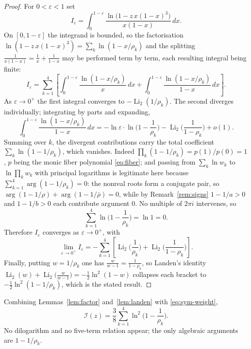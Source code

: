 \documentclass[11pt]{article}
\theoremstyle{definition}
\DeclareMathOperator{\Li}{Li}
\begin{document}
\begin{proof}
For $0<\varepsilon<1$ set
\[
  I_\varepsilon=\int_0^{1-\varepsilon}\frac{\ln\!\big(1-z\,x(1-x)^3\big)}{x(1-x)}\,dx .
\]
On $[0,1-\varepsilon]$ the integrand is bounded, so the factorisation
$\ln(1-z\,x(1-x)^3)=\sum_k\ln(1-x/\rho_k)$ and the splitting
$\tfrac1{x(1-x)}=\tfrac1x+\tfrac1{1-x}$ may be performed term by term, each resulting integral being
finite:
\[
  I_\varepsilon=\sum_{k=1}^4\left[\int_0^{1-\varepsilon}\frac{\ln(1-x/\rho_k)}{x}\,dx
  +\int_0^{1-\varepsilon}\frac{\ln(1-x/\rho_k)}{1-x}\,dx\right].
\]
As $\varepsilon\to0^+$ the first integral converges to $-\Li_2(1/\rho_k)$. The second diverges
individually; integrating by parts and expanding,
\[
  \int_0^{1-\varepsilon}\frac{\ln(1-x/\rho_k)}{1-x}\,dx
  =-\ln\varepsilon\cdot\ln\!\Big(1-\frac1{\rho_k}\Big)-\Li_2\!\Big(\frac{1}{1-\rho_k}\Big)+o(1).
\]
Summing over $k$, the divergent contributions carry the total coefficient
$\sum_{k}\ln(1-1/\rho_k)$, which vanishes. Indeed $\prod_k(1-1/\rho_k)=p(1)/p(0)=1$, $p$ being the
monic fiber polynomial \eqref{eq:fiber}; and passing from $\sum_k\ln w_k$ to $\ln\prod_k w_k$ with
principal logarithms is legitimate here because $\sum_{k=1}^4\arg(1-1/\rho_k)=0$: the nonreal roots
form a conjugate pair, so $\arg(1-1/\rho)+\arg(1-1/\bar\rho)=0$, while by Remark~\ref{rem:signs}
$1-1/a>0$ and $1-1/b>0$ each contribute argument $0$. No multiple of $2\pi i$ intervenes, so
\[
  \sum_{k=1}^4\ln\Big(1-\frac1{\rho_k}\Big)=\ln 1=0 .
\]
Therefore $I_\varepsilon$ converges as $\varepsilon\to0^+$, with
\[
  \lim_{\varepsilon\to0^+}I_\varepsilon
  =-\sum_{k=1}^4\left[\Li_2\!\Big(\frac1{\rho_k}\Big)+\Li_2\!\Big(\frac{1}{1-\rho_k}\Big)\right].
\]
Finally, putting $w=1/\rho_k$ one has $\tfrac{w}{w-1}=\tfrac{1}{1-\rho_k}$, so Landen's identity
$\Li_2(w)+\Li_2\!\big(\tfrac{w}{w-1}\big)=-\tfrac12\ln^2(1-w)$ collapses each bracket to
$-\tfrac12\ln^2(1-1/\rho_k)$, which is the stated result. \qedhere
\end{proof}

Combining Lemmas~\ref{lem:factor} and~\ref{lem:landen} with \eqref{eq:sym-weight},
\begin{equation}\label{eq:landen-form}
  \boxed{\;\mathcal{I}(z)=\frac38\sum_{k=1}^4\ln^2\!\Big(1-\frac1{\rho_k}\Big).\;}
\end{equation}
No dilogarithm and no five-term relation appear; the only algebraic arguments are $1-1/\rho_k$.
\end{document}
